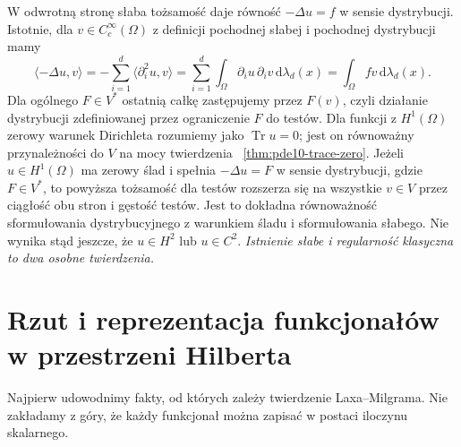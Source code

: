 W odwrotną stronę słaba tożsamość daje równość
$-\Delta u=f$ w sensie dystrybucji. Istotnie, dla
$v\in C_c^\infty(\Omega)$ z definicji pochodnej słabej
i pochodnej dystrybucji mamy
\[
 \langle-\Delta u,v\rangle
 =-\sum_{i=1}^d\langle\partial_i^2u,v\rangle
 =\sum_{i=1}^d\int_\Omega\partial_i u\,\partial_i v
       \,\mathrm d\lambda_d(x)
 =\int_\Omega fv\,\mathrm d\lambda_d(x).
\]
Dla ogólnego $F\in V^*$ ostatnią całkę zastępujemy
przez $F(v)$, czyli działanie dystrybucji zdefiniowanej
przez ograniczenie $F$ do testów.
Dla funkcji z $H^1(\Omega)$ zerowy warunek Dirichleta
rozumiemy jako $\operatorname{Tr}u=0$; jest on
równoważny przynależności do $V$ na mocy twierdzenia
~\ref{thm:pde10-trace-zero}.
Jeżeli $u\in H^1(\Omega)$ ma zerowy ślad i spełnia
$-\Delta u=F$ w sensie dystrybucji, gdzie $F\in V^*$,
to powyższa tożsamość dla testów rozszerza się na
wszystkie $v\in V$ przez ciągłość obu stron
i gęstość testów. Jest to dokładna równoważność
sformułowania dystrybucyjnego z warunkiem śladu
i sformułowania słabego.
Nie wynika stąd jeszcze, że $u\in H^2$ lub $u\in C^2$.
\emph{Istnienie słabe i regularność klasyczna to dwa osobne twierdzenia.}

\section{Rzut i reprezentacja funkcjonałów w przestrzeni Hilberta}
\label{sec:pde11-hilbert}

Najpierw udowodnimy fakty, od których zależy twierdzenie Laxa--Milgrama.
Nie zakładamy z góry, że każdy funkcjonał można zapisać
w postaci iloczynu skalarnego.

